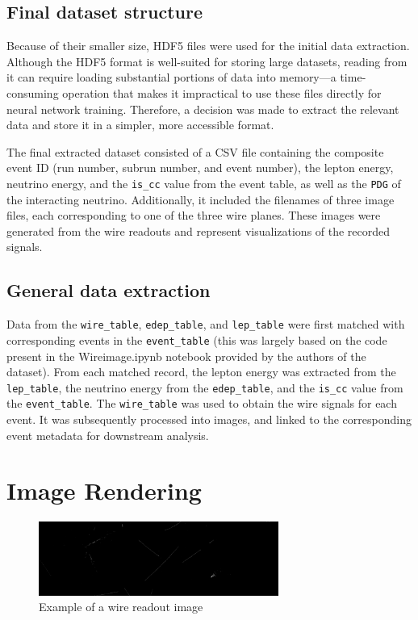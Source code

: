 \documentclass{pracalicmgr}
\begin{document}
\subsection{Final dataset structure}

Because of their smaller size, HDF5 files were used for the initial data extraction. Although the HDF5 format is well-suited for storing large datasets, reading from it can require loading substantial portions of data into memory—a time-consuming operation that makes it impractical to use these files directly for neural network training. Therefore, a decision was made to extract the relevant data and store it in a simpler, more accessible format.

The final extracted dataset consisted of a CSV file containing the composite event ID (run number, subrun number, and event number), the lepton energy, neutrino energy, and the \texttt{is\_cc} value from the event table, as well as the \texttt{PDG} of the interacting neutrino. Additionally, it included the filenames of three image files, each corresponding to one of the three wire planes. These images were generated from the wire readouts and represent visualizations of the recorded signals.

\subsection{General data extraction}

Data from the \texttt{wire\_table}, \texttt{edep\_table}, and \texttt{lep\_table} were first matched with corresponding events in the \texttt{event\_table} (this was largely based on the code present in the Wireimage.ipynb notebook provided by the authors of the dataset). From each matched record, the lepton energy was extracted from the \texttt{lep\_table}, the neutrino energy from the \texttt{edep\_table}, and the \texttt{is\_cc} value from the \texttt{event\_table}. The \texttt{wire\_table} was used to obtain the wire signals for each event. It was subsequently processed into images, and linked to the corresponding event metadata for downstream analysis.

\section{Image Rendering}

\begin{figure}[H]
    \centering
    \includegraphics[width=0.7\textwidth]{src/with_flag_58.png}
    \caption{Example of a wire readout image}
\end{figure}
\end{document}

